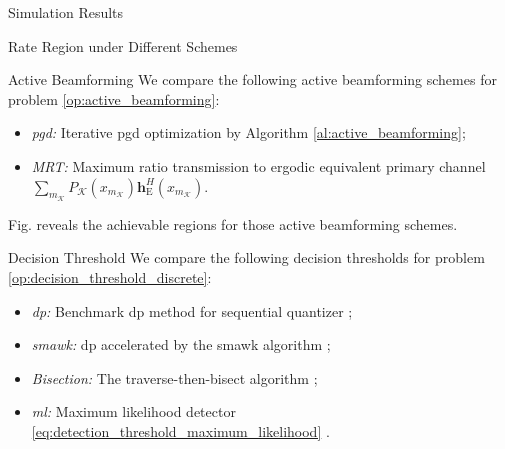\documentclass[journal]{IEEEtran}
\begin{document}
\begin{section}{Simulation Results}
\begin{subsection}{Rate Region under Different Schemes}
		\begin{subsubsection}{Active Beamforming}
			We compare the following active beamforming schemes for problem \eqref{op:active_beamforming}:
			\begin{itemize}
				\item \emph{\gls{pgd}:} Iterative \gls{pgd} optimization by Algorithm \ref{al:active_beamforming};
				\item \emph{MRT:} Maximum ratio transmission to ergodic equivalent primary channel $\sum_{m_{\mathcal{K}}} P_{\mathcal{K}}(x_{m_{\mathcal{K}}}) \boldsymbol{h}_{\mathrm{E}}^H(x_{m_{\mathcal{K}}})$.
			\end{itemize}

			Fig.  reveals the achievable regions for those active beamforming schemes.

		\end{subsubsection}

		\begin{subsubsection}{Decision Threshold}
			We compare the following decision thresholds for problem \eqref{op:decision_threshold_discrete}:
			\begin{itemize}
				\item \emph{\gls{dp}:} Benchmark \gls{dp} method for sequential quantizer \cite{He2021};
				\item \emph{\gls{smawk}:} \gls{dp} accelerated by the \gls{smawk} algorithm \cite{He2021};
				\item \emph{Bisection:} The traverse-then-bisect algorithm \cite{Nguyen2020a};
				\item \emph{\gls{ml}:} Maximum likelihood detector \eqref{eq:detection_threshold_maximum_likelihood} \cite{Qian2019}.
			\end{itemize}


\end{subsubsection}
\end{subsection}
\end{section}
\end{document}
